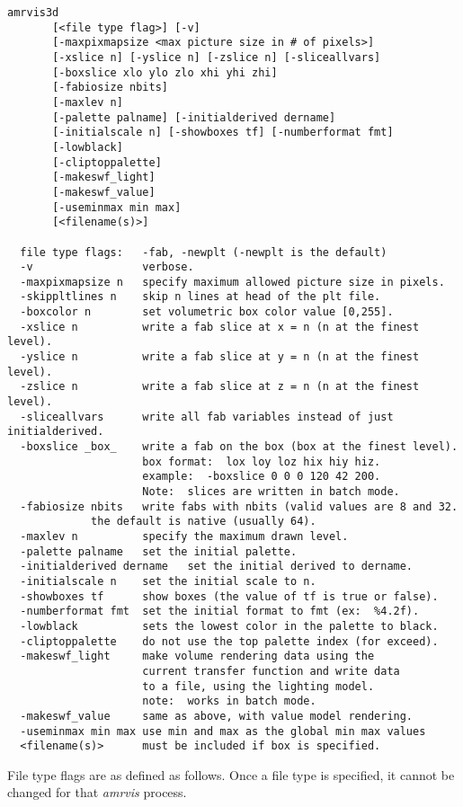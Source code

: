 \begin{verbatim}
amrvis3d
       [<file type flag>] [-v]
       [-maxpixmapsize <max picture size in # of pixels>]
       [-xslice n] [-yslice n] [-zslice n] [-sliceallvars]
       [-boxslice xlo ylo zlo xhi yhi zhi]
       [-fabiosize nbits]
       [-maxlev n]
       [-palette palname] [-initialderived dername]
       [-initialscale n] [-showboxes tf] [-numberformat fmt]
       [-lowblack]
       [-cliptoppalette]
       [-makeswf_light]
       [-makeswf_value]
       [-useminmax min max]
       [<filename(s)>]

  file type flags:   -fab, -newplt (-newplt is the default)
  -v                 verbose.
  -maxpixmapsize n   specify maximum allowed picture size in pixels.
  -skippltlines n    skip n lines at head of the plt file.
  -boxcolor n        set volumetric box color value [0,255].
  -xslice n          write a fab slice at x = n (n at the finest level).
  -yslice n          write a fab slice at y = n (n at the finest level).
  -zslice n          write a fab slice at z = n (n at the finest level).
  -sliceallvars      write all fab variables instead of just initialderived.
  -boxslice _box_    write a fab on the box (box at the finest level).
                     box format:  lox loy loz hix hiy hiz.
                     example:  -boxslice 0 0 0 120 42 200.
                     Note:  slices are written in batch mode.
  -fabiosize nbits   write fabs with nbits (valid values are 8 and 32.
		     the default is native (usually 64).
  -maxlev n          specify the maximum drawn level.
  -palette palname   set the initial palette.
  -initialderived dername   set the initial derived to dername.
  -initialscale n    set the initial scale to n.
  -showboxes tf      show boxes (the value of tf is true or false).
  -numberformat fmt  set the initial format to fmt (ex:  %4.2f).
  -lowblack          sets the lowest color in the palette to black.
  -cliptoppalette    do not use the top palette index (for exceed).
  -makeswf_light     make volume rendering data using the
                     current transfer function and write data
                     to a file, using the lighting model.
                     note:  works in batch mode.
  -makeswf_value     same as above, with value model rendering.
  -useminmax min max use min and max as the global min max values
  <filename(s)>      must be included if box is specified.
\end{verbatim}


File type flags are as defined as follows.  Once a file type is specified,
it cannot be changed for that {\em amrvis} process.

